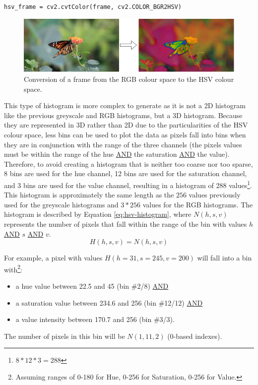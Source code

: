 \begin{lstlisting}
hsv_frame = cv2.cvtColor(frame, cv2.COLOR_BGR2HSV)
\end{lstlisting}

\begin{figure}[h] 
\centerline{\includegraphics[width=\textwidth]{figures/implementation/rgb_to_hsv.png}}
\caption{\label{fig:rgb_to_hsv}Conversion of a frame from the RGB colour space to the HSV colour space.}
\end{figure}

This type of histogram is more complex to generate as it is not a 2D histogram like the previous greyscale and RGB histograms, but a 3D histogram. Because they are represented in 3D rather than 2D due to the particularities of the HSV colour space, less bins can be used to plot the data as pixels fall into bins when they are in conjunction with the range of the three channels (the pixels values must be within the range of the hue \underline{AND} the saturation \underline{AND} the value). Therefore, to avoid creating a histogram that is neither too coarse nor too sparse, 8 bins are used for the hue channel, 12 bins are used for the saturation channel, and 3 bins are used for the value channel, resulting in a histogram of 288 values\footnote{$8*12*3=288$}. This histogram is approximately the same length as the $256$ values previously used for the greyscale histograms and $3*256$ values for the RGB histograms. The histogram is described by Equation \ref{eq:hsv-histogram}, where $N(h,s,v)$ represents the number of pixels that fall within the range of the bin with values $h$ \underline{AND} $s$ \underline{AND} $v$.\\
\begin{equation}
\label{eq:hsv-histogram}
    H(h,s,v)=N(h,s,v)
\end{equation}

For example, a pixel with values $H(h=31, s=245, v=200)$ will fall into a bin with\footnote{Assuming ranges of 0-180 for Hue, 0-256 for Saturation, 0-256 for Value.}:
\begin{itemize}
    \item a hue value between 22.5 and 45 (bin \#2/8) \underline{AND}
    \item a saturation value between 234.6 and 256 (bin \#12/12) \underline{AND} 
    \item a value intensity between 170.7 and 256 (bin \#3/3).
\end{itemize}
The number of pixels in this bin will be $N(1,11,2)$ (0-based indexes).\\

